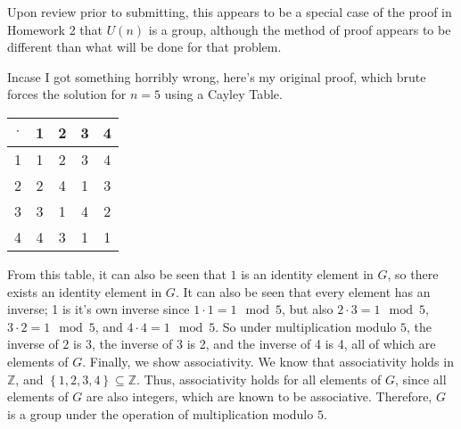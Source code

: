 \documentclass[11pt, letterpaper]{report}
\newcounter{prob}\setcounter{prob}{0}
\renewenvironment{solution}[1][]{\begin{bwaaa}}{\end{bwaaa}\vspace{10pt}}
\begin{document}
\begin{solution}
Upon review prior to submitting, this appears to be a special case of the proof in Homework 2 that $U(n)$ is a group, although the method of proof appears to be different than what will be done for that problem.

Incase I got something horribly wrong, here's my original proof, which brute forces the solution for $n=5$ using a Cayley Table.

	\begin{center}
		\begin{tabular}{c|cccc}
			$\cdot $ &1&2&3&4\\
			\hline
			1&1&2&3&4\\
			2&2&4&1&3\\
			3&3&1&4&2\\
			4&4&3&1&1
		\end{tabular}
	\end{center}
	From this table, it can also be seen that $1$ is an identity element in $G$, so there exists an identity element in $G$. It can also be seen that every element has an inverse; 1 is it's own inverse since $1\cdot 1=1\mod 5$, but also $2\cdot 3=1\mod 5$, $3\cdot2 =1\mod 5$, and $4\cdot 4=1\mod 5$. So under multiplication modulo $5$, the inverse of $2$ is $3$, the inverse of $3$ is 2, and the inverse of 4 is 4, all of which are elements of $G$. Finally, we show associativity. We know that associativity holds in $\mathbb{Z}$, and $\left\{ 1,2,3,4 \right\} \subseteq \mathbb{Z}$. Thus, associativity holds for all elements of $G$, since all elements of $G$ are also integers, which are known to be associative. Therefore, $G$ is a group under the operation of multiplication modulo $5$.
\end{solution}
\end{document}
